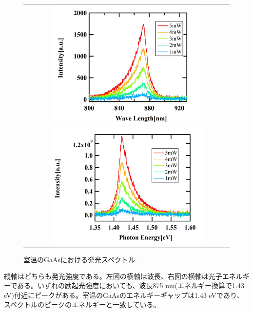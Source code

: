 \documentclass[11pt,a4j]{jsarticle}
\begin{document}
\begin{figure}[ht]
 \centering
 \begin{tabular}{c}

  \begin{minipage}{0.52\hsize}

   \includegraphics[clip,width=8cm]{start2_GaAs_rt_Spectrum_wav.jpg}
  \end{minipage}

  \begin{minipage}{0.5\hsize}
   \centering
   \includegraphics[clip,width=8.3cm]{start2_GaAs_rt_Spectrum_eV.jpg}
  \end{minipage}
 \end{tabular}
 \caption{室温のGaAsにおける発光スペクトル.}
 \label{fig_gaas_rt_spec1}

\end{figure}

縦軸はどちらも発光強度である。左図の横軸は波長、右図の横軸は光子エネルギーである。いずれの励起光強度においても、波長875 nm(エネルギー換算で1.43 eV)付近にピークがある。室温のGaAsのエネルギーギャップは1.43 eVであり\cite{gapE}、スペクトルのピークのエネルギーと一致している。

\end{document}
